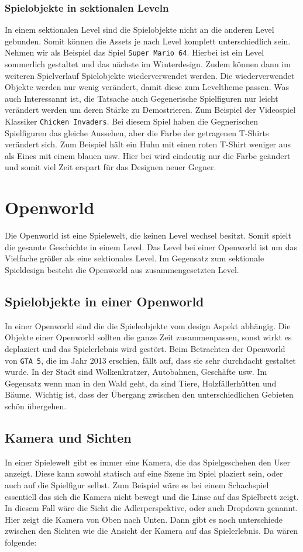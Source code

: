\subsubsection{Spielobjekte in sektionalen Leveln}
In einem sektionalen Level sind die Spielobjekte nicht an die anderen Level gebunden. Somit können die Assets je nach Level komplett unterschiedlich sein. Nehmen wir als Beispiel das Spiel \verb+Super Mario 64+. Hierbei ist ein Level sommerlich gestaltet und das nächste im Winterdesign. Zudem können dann im weiteren Spielverlauf Spielobjekte wiederverwendet werden. Die wiederverwendet Objekte werden nur wenig verändert, damit diese zum Leveltheme passen. Was auch Interessannt ist, die Tatsache auch Gegenerische Spielfiguren nur leicht verändert werden um deren Stärke zu Demostrieren. Zum Beispiel der Videospiel Klassiker \verb+Chicken Invaders+. Bei diesem Spiel haben die Gegnerischen Spielfiguren das gleiche Aussehen, aber die Farbe der getragenen T-Shirts verändert sich. Zum Beispiel hält ein Huhn mit einen roten T-Shirt weniger aus als Eines mit einem blauen usw. Hier bei wird eindeutig nur die Farbe geändert und somit viel Zeit erspart für das Designen neuer Gegner.

\section{Openworld}
Die Openworld ist eine Spielewelt, die keinen Level wechsel besitzt. Somit spielt die gesamte Geschichte in einem Level. Das Level bei einer Openworld ist um das Vielfache größer als eine sektionales Level. Im Gegensatz zum sektionale Spieldesign besteht die Openworld aus zusammengesetzten Level.


\subsection{Spielobjekte in einer Openworld}
In einer Openworld sind die die Spieleobjekte vom design Aspekt abhängig. Die Objekte einer Openworld sollten die ganze Zeit zusammenpassen, sonst wirkt es deplaziert und das Spielerlebnis wird gestört. Beim Betrachten der Openworld von \verb+GTA 5+, die im Jahr 2013 erschien, fällt auf, dass sie sehr durchdacht gestaltet wurde. In der Stadt sind Wolkenkratzer, Autobahnen, Geschäfte usw. Im Gegensatz wenn man in den Wald geht, da sind Tiere, Holzfällerhütten und Bäume. Wichtig ist, dass der Übergang zwischen den unterschiedlichen Gebieten schön übergehen. 


\subsection{Kamera und Sichten}
In einer Spielewelt gibt es immer eine Kamera, die das Spielgeschehen den User  anzeigt. Diese kann sowohl statisch auf eine Szene im Spiel plaziert sein, oder auch auf die Spielfigur selbst. Zum Beispiel wäre es bei einem Schachspiel essentiell das sich die Kamera nicht bewegt und die Linse auf das Spielbrett zeigt. In diesem Fall wäre die Sicht die Adlerperspektive, oder auch Dropdown genannt. Hier zeigt die Kamera von Oben nach Unten. Dann gibt es noch unterschiede zwischen den Sichten wie die Ansicht der Kamera auf das Spielerlebnis. Da wären folgende:


